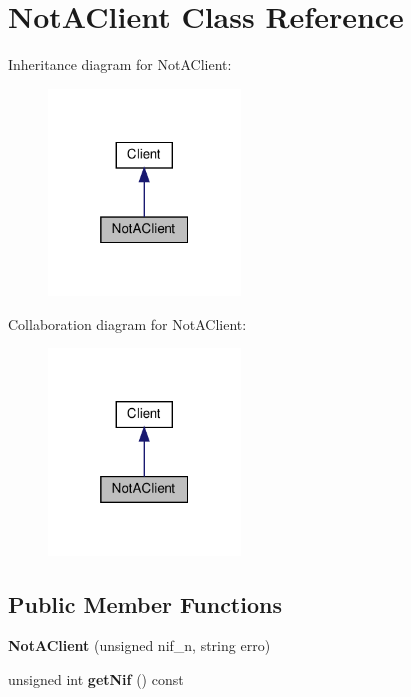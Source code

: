 \hypertarget{class_not_a_client}{}\section{Not\+A\+Client Class Reference}
\label{class_not_a_client}


Inheritance diagram for Not\+A\+Client\+:\nopagebreak
\begin{figure}[H]
\begin{center}
\leavevmode
\includegraphics[width=145pt]{class_not_a_client__inherit__graph}
\end{center}
\end{figure}


Collaboration diagram for Not\+A\+Client\+:\nopagebreak
\begin{figure}[H]
\begin{center}
\leavevmode
\includegraphics[width=145pt]{class_not_a_client__coll__graph}
\end{center}
\end{figure}
\subsection*{Public Member Functions}
\begin{DoxyCompactItemize}
\item 
\mbox{\label{class_not_a_client_ababe63b9416f4dd90045d6086292724d}} 
{\bfseries Not\+A\+Client} (unsigned nif\+\_\+n, string erro)
\item 
\mbox{\label{class_not_a_client_a70136e2a67ce191dd0091bb8ace19dd9}} 
unsigned int {\bfseries get\+Nif} () const
\end{DoxyCompactItemize}
